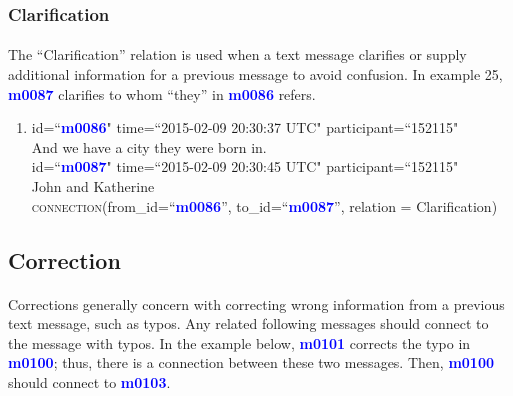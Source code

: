 \documentclass{article}
\begin{document}
\subsubsection{Clarification}
\paragraph{}
The ``Clarification'' relation is used when a text message clarifies or supply additional information for a previous message to avoid confusion. In example 25, \textbf{\textcolor{blue}{m0087}} clarifies to whom ``they'' in \textbf{\textcolor{blue}{m0086}} refers. 

\begin{enumerate}[resume]
\item id=``\textbf{\textcolor{blue}{m0086}}" time=``2015-02-09 20:30:37 UTC" participant=``152115"\\
And we have a city they were born in.\\
id=``\textbf{\textcolor{blue}{m0087}}" time=``2015-02-09 20:30:45 UTC" participant=``152115"\\
John and Katherine\\
\textsc{connection}(from\_id=``\textbf{\textcolor{blue}{m0086}}'', to\_id=``\textbf{\textcolor{blue}{m0087}}'', relation = Clarification)
\end{enumerate}

\subsection{Correction}
\paragraph{}
Corrections generally concern with correcting wrong information from a previous text message, such as typos. Any related following messages should connect to the message with typos. In the example below, \textbf{\textcolor{blue}{m0101}} corrects the typo in \textbf{\textcolor{blue}{m0100}}; thus, there is a connection between these two messages. Then, \textbf{\textcolor{blue}{m0100}} should connect to \textbf{\textcolor{blue}{m0103}}.
\end{document}
